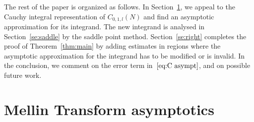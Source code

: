 \documentclass[a4paper]{amsart}
\begin{document}
The rest of the paper is organized as follows. In Section~\ref{se:mellin},
we appeal to the Cauchy integral representation of $C_{0,1,l}(N)$
and find an asymptotic approximation for its integrand.
The new integrand is analysed in Section~\ref{se:saddle}
by the saddle point method. Section~\ref{se:right} completes the proof
of Theorem~\ref{thm:main} by adding estimates in regions
where the asymptotic approximation for the integrand has to be
modified or is invalid. In the conclusion, we comment on the error term
in~$\eqref{eq:C asympt}$, and on possible future work.



\section{Mellin Transform asymptotics}\label{se:mellin}
\end{document}
